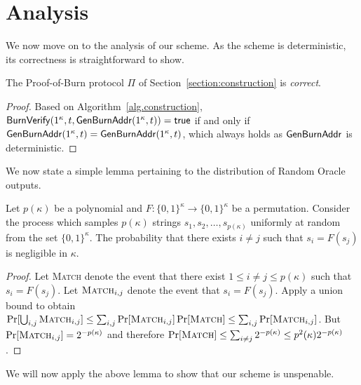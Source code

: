 \section{Analysis}

We now move on to the analysis of our scheme. As the scheme is deterministic,
its correctness is straightforward to show.

\begin{theorem}[Correctness]
  The Proof-of-Burn protocol $\Pi$ of Section~\ref{section:construction} is \emph{correct}.
\end{theorem}
\begin{proof}
  Based on Algorithm~\ref{alg.construction}, $\mathsf{BurnVerify}(1^\kappa, t, \mathsf{Gen}\-\mathsf{Burn}\-\mathsf{Addr}(1^\kappa, t)) = \textsf{true}$ if and only if $\mathsf{Gen}\-\mathsf{Burn}\-\mathsf{Addr}(1^\kappa, t) = \mathsf{Gen}\-\mathsf{Burn}\-\mathsf{Addr}(1^\kappa, t)$, which always holds as $\mathsf{Gen}\-\mathsf{Burn}\-\mathsf{Addr}$ is deterministic.
\end{proof}

We now state a simple lemma pertaining to the distribution of Random Oracle
outputs.

\begin{lemma}[Perturbation]
  \label{lem.perturbation}
  Let $p(\kappa)$ be a polynomial and
  $F: \{0,1\}^\kappa \longrightarrow \{0,1\}^\kappa$ be a permutation.
  Consider the process which samples $p(\kappa)$ strings $s_1, s_2, \dots, s_{p(\kappa)}$ uniformly at random from the set $\{0, 1\}^\kappa$. The probability that there exists $i \neq j$ such that $s_i = F(s_j)$ is negligible in $\kappa$.
\end{lemma}
\begin{proof}
  Let \textsc{Match} denote the event that there exist $1 \leq i \neq j \leq p(\kappa)$ such that $s_i = F(s_j)$.
  Let $\textsc{Match}_{i, j}$ denote the event that $s_i = F(s_j)$. Apply a union bound to obtain
  $
    \Pr[\bigcup_{i, j}\textsc{Match}_{i, j}] \leq \sum_{i, j} \Pr[\textsc{Match}_{i, j}]
    \Pr[\textsc{Match}] \leq \sum_{i, j} \Pr[\textsc{Match}_{i, j}]
  $.
  But $\Pr[\textsc{Match}_{i, j}] = 2^{-p(\kappa)}$ and therefore
  $\Pr[\textsc{Match}] \leq \sum_{i \neq j} 2^{-p(\kappa)} \leq p^2(\kappa) 2^{-p(\kappa)}$.
\end{proof}

We will now apply the above lemma to show that our scheme is unspenable.

